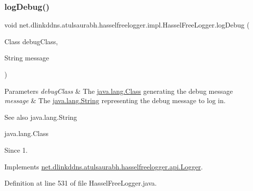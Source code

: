 \subsubsection{\texorpdfstring{log\+Debug()}{logDebug()}\hspace{0.1cm}{\footnotesize\ttfamily [2/3]}}
{\footnotesize\ttfamily void net.\+dlinkddns.\+atulsaurabh.\+hasselfreelogger.\+impl.\+Hassel\+Free\+Logger.\+log\+Debug (\begin{DoxyParamCaption}\item[{Class}]{debug\+Class,  }\item[{String}]{message }\end{DoxyParamCaption})}


\begin{DoxyParams}{Parameters}
{\em debug\+Class} & The \mbox{\hyperlink{}{java.\+lang.\+Class}} generating the debug message \\
\hline
{\em message} & The \mbox{\hyperlink{}{java.\+lang.\+String}} representing the debug message to log in. \\
\hline
\end{DoxyParams}
\begin{DoxySeeAlso}{See also}
java.\+lang.\+String 

java.\+lang.\+Class 
\end{DoxySeeAlso}
\begin{DoxySince}{Since}
1. 
\end{DoxySince}


Implements \mbox{\hyperlink{interfacenet_1_1dlinkddns_1_1atulsaurabh_1_1hasselfreelogger_1_1api_1_1_logger_a029beee59dc44362c279f0a067dd0703}{net.\+dlinkddns.\+atulsaurabh.\+hasselfreelogger.\+api.\+Logger}}.



Definition at line 531 of file Hassel\+Free\+Logger.\+java.

\mbox{\label{classnet_1_1dlinkddns_1_1atulsaurabh_1_1hasselfreelogger_1_1impl_1_1_hassel_free_logger_a0995d59f7b5262af4be98f4e7ba21cd0}} 

